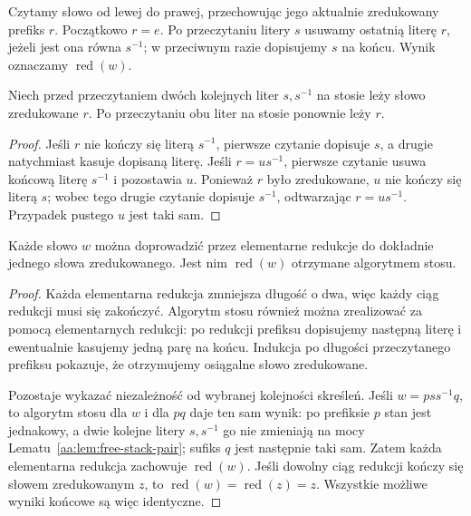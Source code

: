 \begin{definicja}
\label{aa:def:free-stack}
Czytamy słowo od lewej do prawej, przechowując jego aktualnie
zredukowany prefiks $r$. Początkowo $r=e$.
Po przeczytaniu litery $s$ usuwamy ostatnią literę $r$, jeżeli jest
ona równa $s^{-1}$; w przeciwnym razie dopisujemy $s$ na końcu.
Wynik oznaczamy $\operatorname{red}(w)$.
\end{definicja}

\begin{lemat}
\label{aa:lem:free-stack-pair}
\label{lem:stos}
Niech przed przeczytaniem dwóch kolejnych liter $s,s^{-1}$
na stosie leży słowo zredukowane $r$. Po przeczytaniu obu liter
na stosie ponownie leży $r$.
\end{lemat}
\begin{proof}
Jeśli $r$ nie kończy się literą $s^{-1}$, pierwsze czytanie
dopisuje $s$, a drugie natychmiast kasuje dopisaną literę.
Jeśli $r=us^{-1}$, pierwsze czytanie usuwa końcową literę
$s^{-1}$ i pozostawia $u$. Ponieważ $r$ było zredukowane,
$u$ nie kończy się literą $s$; wobec tego drugie czytanie
dopisuje $s^{-1}$, odtwarzając $r=us^{-1}$.
Przypadek pustego $u$ jest taki sam.
\end{proof}

\begin{twierdzenie}
\label{aa:tw:free-reduction}
\label{tw:redukcja}
Każde słowo $w$ można doprowadzić przez elementarne redukcje
do dokładnie jednego słowa zredukowanego. Jest nim
$\operatorname{red}(w)$ otrzymane algorytmem stosu.
\end{twierdzenie}
\begin{proof}
Każda elementarna redukcja zmniejsza długość o dwa, więc każdy
ciąg redukcji musi się zakończyć. Algorytm stosu również można
zrealizować za pomocą elementarnych redukcji: po redukcji prefiksu
dopisujemy następną literę i ewentualnie kasujemy jedną parę na końcu.
Indukcja po długości przeczytanego prefiksu pokazuje, że otrzymujemy
osiągalne słowo zredukowane.

Pozostaje wykazać niezależność od wybranej kolejności skreśleń.
Jeśli $w=pss^{-1}q$, to algorytm stosu dla $w$ i dla $pq$
daje ten sam wynik: po prefiksie $p$ stan jest jednakowy,
a dwie kolejne litery $s,s^{-1}$ go nie zmieniają na mocy
Lematu~\ref{aa:lem:free-stack-pair}; sufiks $q$ jest następnie
taki sam. Zatem każda elementarna redukcja zachowuje
$\operatorname{red}(w)$. Jeśli dowolny ciąg redukcji kończy się
słowem zredukowanym $z$, to
$\operatorname{red}(w)=\operatorname{red}(z)=z$.
Wszystkie możliwe wyniki końcowe są więc identyczne.
\end{proof}

